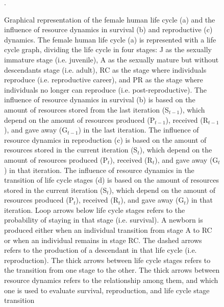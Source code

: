\documentclass{article}
\begin{document}
\begin{figure}[H]
\caption{Graphical representation of the female human life cycle (a) and the influence of resource dynamics in survival (b) and reproductive (c) dynamics. The female human life cycle (a) is represented with a life cycle graph, dividing the life cycle in four stages: J as the sexually immature stage (i.e. juvenile), A as the sexually mature but without descendants stage (i.e. adult), RC as the stage where individuals reproduce (i.e. reproductive career), and PR as the stage where individuals no longer can reproduce (i.e. post-reproductive). The influence of resource dynamics in survival (b) is based on the amount of resources stored from the last iteration (S$_{t-1}$), which depend on the amount of resources produced (P$_{t-1}$), received (R$_{t-1}$), and gave away (G$_{t-1}$) in the last iteration. The influence of resource dynamics in reproduction (c) is based on the amount of resources stored in the current iteration (S$_t$), which depend on the amount of resources produced (P$_{t}$), received (R$_{t}$), and gave away (G$_{t}$) in that iteration. The influence of resource dynamics in the transition of life cycle stages (d) is based on the amount of resources stored in the current iteration (S$_t$), which depend on the amount of resources produced (P$_{t}$), received (R$_{t}$), and gave away (G$_{t}$) in that iteration. Loop arrows below life cycle stages refers to the probability of staying in that stage (i.e. survival). A newborn is produced either when an individual transition from stage A to RC or when an individual remains in stage RC. The dashed arrows refers to the production of a descendant in that life cycle (i.e. reproduction). The thick arrows between life cycle stages refers to the transition from one stage to the other. The thick arrows between resource dynamics refers to the relationship among them, and which one is used to evaluate survival, reproduction, and life cycle stage transition}.
    \label{fig:2}
\end{figure}

\clearpage



\end{document}
